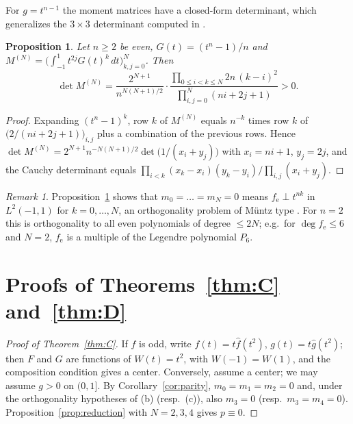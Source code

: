 \documentclass[11pt]{amsart}
\numberwithin{equation}{section}
\theoremstyle{plain}
\newtheorem{proposition}[theorem]{Proposition}
\theoremstyle{definition}
\theoremstyle{remark}
\newtheorem{remark}[theorem]{Remark}
\newcommand{\fe}{f_{\mathrm e}}
\begin{document}
For $g=t^{n-1}$ the moment matrices have a closed-form determinant, which
generalizes the $3\times3$ determinant computed in \cite[Thm.~1.12]{ALA20}.

\begin{proposition}\label{prop:cauchy}
Let $n\ge2$ be even, $G(t)=(t^n-1)/n$ and
$M^{(N)}=\bigl(\int_{-1}^1t^{2j}G(t)^k\,dt\bigr)_{k,j=0}^N$. Then
\[
 \det M^{(N)}
 =\frac{2^{N+1}}{n^{N(N+1)/2}}\cdot
 \frac{\prod_{0\le i<k\le N}2n\,(k-i)^2}{\prod_{i,j=0}^N(ni+2j+1)}>0 .
\]
\end{proposition}

\begin{proof}
Expanding $(t^n-1)^k$, row $k$ of $M^{(N)}$ equals $n^{-k}$ times row $k$ of
$\bigl(2/(ni+2j+1)\bigr)_{i,j}$ plus a combination of the previous rows. Hence
$\det M^{(N)}=2^{N+1}n^{-N(N+1)/2}\det\bigl(1/(x_i+y_j)\bigr)$ with $x_i=ni+1$,
$y_j=2j$, and the Cauchy determinant equals
$\prod_{i<k}(x_k-x_i)(y_k-y_i)/\prod_{i,j}(x_i+y_j)$.
\end{proof}

\begin{remark}
Proposition~\ref{prop:cauchy} shows that $m_0=\dots=m_N=0$ means
$\fe\perp t^{nk}$ in $L^2(-1,1)$ for $k=0,\dots,N$, an orthogonality problem of
M\"untz type \cite{BE95}. For $n=2$ this is orthogonality to all even
polynomials of degree $\le2N$; e.g.\ for $\deg\fe\le6$ and $N=2$, $\fe$ is a
multiple of the Legendre polynomial $P_6$.
\end{remark}

\section{Proofs of Theorems~\ref{thm:C} and~\ref{thm:D}}\label{sec:CD}

\begin{proof}[Proof of Theorem~\ref{thm:C}]
If $f$ is odd, write $f(t)=t\hat f(t^2)$, $g(t)=t\hat g(t^2)$; then $F$ and $G$
are functions of $W(t)=t^2$, with $W(-1)=W(1)$, and the composition condition
\cite{AL87} gives a center. Conversely, assume a center; we may assume $g>0$ on
$(0,1]$. By Corollary~\ref{cor:parity}, $m_0=m_1=m_2=0$ and, under the
orthogonality hypotheses of (b) (resp.\ (c)), also $m_3=0$ (resp.\
$m_3=m_4=0$). Proposition~\ref{prop:reduction} with $N=2,3,4$ gives $p\equiv0$.
\end{proof}
\end{document}
